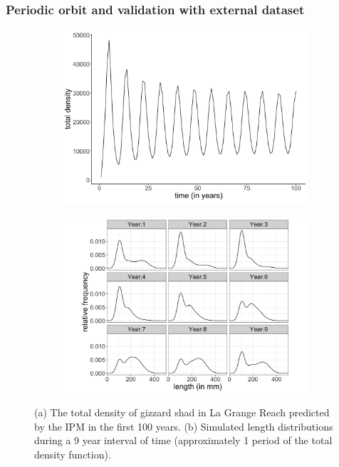 \documentclass[preprint,review,12pt,authoryear]{elsarticle}
\providecommand{\DIFaddbeginFL}{} %
\providecommand{\DIFaddendFL}{} %
\providecommand{\DIFdelbeginFL}{} %
\providecommand{\DIFdelendFL}{} %
\begin{document}
\subsubsection{Periodic orbit and validation with external dataset}
\begin{figure}
\centering
\DIFdelbeginFL %
\DIFdelendFL \DIFaddbeginFL \begin{subfigure}[b]{.48\textwidth}
  \DIFaddendFL \includegraphics[width=\textwidth]{figures/ntotal.png}
   \caption{}
  \label{fig:ntotal}
\end{subfigure}
\DIFdelbeginFL %
\DIFdelendFL \DIFaddbeginFL \begin{subfigure}[b]{.48\textwidth}
 \DIFaddendFL \includegraphics[width=\textwidth]{figures/period_facet.png}
     \caption{}
\label{fig:period}
\end{subfigure}
\caption{(a) The total density of gizzard shad in La Grange Reach predicted by the IPM in the first 100 years. (b) Simulated length distributions during a 9 year interval of time (approximately 1 period of the total density function).}
\end{figure}    
\end{document}
